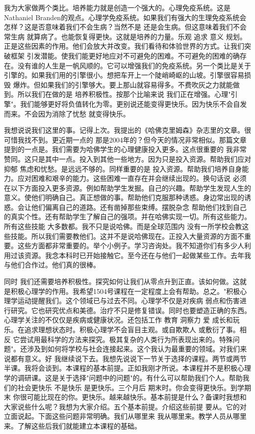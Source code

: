 我为大家做两个类比。培养能力就是创造一个强大的。心理免疫系统。这是Nathaniel Branden的观点。心理学免疫系统。如果我们有强大的生理免疫系统会怎样？这是否意味着我们不会生病？当然不是 还是会生病。但这意味着我们不会常生病 就算病了。也能恢复得更快。这就是培养的力量。乐观 追求 意义 规划。正是这些因素的作用。他们会放大并改变。我们看待和体验世界的方式。让我们突破框架 引发潜能。使我们能更好地应对不可避免的困难。不可避免的困难的确存在。没有谁的人生是一帆风顺的。它可以增强我们的免疫系统。另一个类比是关于引擎的。如果我们用的引擎很小。想把车开上一个陡峭崎岖的山坡。引擎很容易损毁 爆炸。但如果我们的引擎够大。要上那山就容易得多。不费吹灰之力就能做到。所以我们在做的是 培养积极性。按那个比喻来说 我们正在增强。心理"引擎"。我们能够更好将负值转化为零。更别说还能变得更快乐。因为快乐不会自发而来。不会因为消除了忧愁 就变得快乐。 

我想说说我们这里的事。记得上次。我提出的《哈佛克里姆森》杂志里的文章。很可惜我找不到。更近期一点的 那是2004年的？但今天的情况非常相似。那篇文章提到的一点是。我们需要为哈佛学生的心理健康投入更多。这点很重要的 我非常赞同。这只是其中一点。投入到其他一些地方。因为只是投入资源。帮助我们应对抑郁 焦虑和忧愁。是远远不够的。同样重要的是 投入资源。帮助我们培养自身能力。应对困难和艰辛的能力。这些困难一直存在并会继续出现的。换句话说 必须在以下方面投入更多资源。例如帮助学生发掘。自己的兴趣。帮助学生发现人生的意义。使他们明确自己。真正想做的事。帮助他们克服那种诱惑。身边常出现的诱惑。会让他们偏离自己的道路。还有凿掉那些束缚。摆脱杂念 帮助他们找到自己的真实个性。还有帮助学生了解自己的强项。并在哈佛实现一切。所有这些能力。所有这些技能 大多数都。我不只是说哈佛。而是全球范围内 没有一所学校会教这些技能。所以我们需要教他们。这并不是说哈佛现在。正投入大量资源的方面不重要。这些方面都非常重要的。举个小例子。学习咨询处。我不知道你们有多少人利用过该资源。我念本科时已开始接触它。至今还在与他们一起做某些工作。去年我与他们合作过。他们真的很棒。 

同时 我们还需要培养积极性。探究如何让我们从零点升到正直。该如何做。这就是积极心理学的作用。我希望1504号课程在一定程度上会有帮助。总之。"积极心理学运动提醒我们。这个领域已与过去不同。心理学不仅是对疾病 弱点和伤害进行研究。它也研究优点和美德。治疗不只是修复错误。同时也要塑造正确的东西。心理学关注的不仅仅是疾病或健康状况。还包括工作 教育 洞察力 爱 成长和玩乐。在追求理想状态时。积极心理学不会盲目主观。或自欺欺人 或敷衍了事。相反 它尝试用最科学的方法来探究。极其复杂的人类行为所表现出来的。特殊问题"。还涉及到如何将学校与社会连接起来。这个我认为最重要的领域。对我们来说都有意义。好 我继续说下去。我想先说说下一节关于选择的课程。两节或两节半课。我将会谈到。本课程的基本前提。正如我刚才所说。本课程并不是积极心理学的调研课。这是关于选择"问题中的问题"的。有什么可以帮助我们个人。帮助我们的社会更快乐 不是快乐 是更快乐。三个月后 期末时。你会变得更快乐。到学期末 你很可能比现在的你。更快乐。越来越快乐。基本前提是什么？备课时我想和大家说些什么呢？我想为大家介绍。五个基本前提。介绍这些前提 要从。它的对立面说起。下面这些问题非常明确。我们从哪里来 我从哪里来。教学人员从哪里来。了解这些后我们就能建立本课程的基础。 

